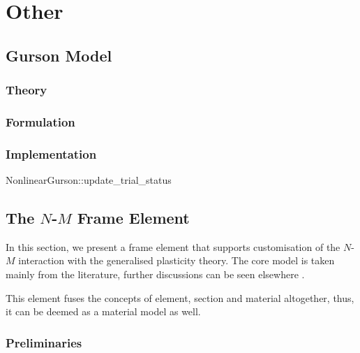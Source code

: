 \chapter{Other}
\section{Gurson Model}
\subsection{Theory}
\subsection{Formulation}
\subsection{Implementation}
\begin{cppcode}
NonlinearGurson::update_trial_status
\end{cppcode}
\section{The \texorpdfstring{$N$-$M$}{N-M} Frame Element}
In this section, we present a frame element that supports customisation of the $N$-$M$ interaction with the generalised plasticity theory. The core model is taken mainly from the literature, further discussions can be seen elsewhere \cite{Chang2023}.

This element fuses the concepts of element, section and material altogether, thus, it can be deemed as a material model as well.
\subsection{Preliminaries}
